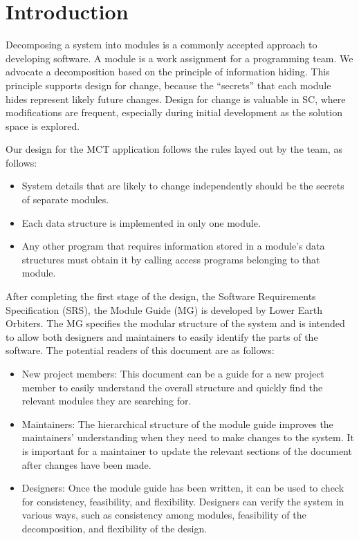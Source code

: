 \documentclass[12pt, titlepage]{article}
\begin{document}
\newpage

\tableofcontents

\listoftables

\listoffigures

\newpage


\section{Introduction}

Decomposing a system into modules is a commonly accepted approach to developing
software.  A module is a work assignment for a programming
team.  We advocate a decomposition
based on the principle of information hiding.  This
principle supports design for change, because the ``secrets'' that each module
hides represent likely future changes.  Design for change is valuable in SC,
where modifications are frequent, especially during initial development as the
solution space is explored.  

Our design for the MCT application follows the rules layed out by the team, as follows:
\begin{itemize}
\item System details that are likely to change independently should be the
  secrets of separate modules.
\item Each data structure is implemented in only one module.
\item Any other program that requires information stored in a module's data
  structures must obtain it by calling access programs belonging to that module.
\end{itemize}

After completing the first stage of the design, the Software Requirements
Specification (SRS), the Module Guide (MG) is developed by Lower Earth Orbiters. The MG
specifies the modular structure of the system and is intended to allow both
designers and maintainers to easily identify the parts of the software.  The
potential readers of this document are as follows:

\begin{itemize}
\item New project members: This document can be a guide for a new project member
  to easily understand the overall structure and quickly find the
  relevant modules they are searching for.
\item Maintainers: The hierarchical structure of the module guide improves the
  maintainers' understanding when they need to make changes to the system. It is
  important for a maintainer to update the relevant sections of the document
  after changes have been made.
\item Designers: Once the module guide has been written, it can be used to
  check for consistency, feasibility, and flexibility. Designers can verify the
  system in various ways, such as consistency among modules, feasibility of the
  decomposition, and flexibility of the design.
\end{itemize}
\end{document}
